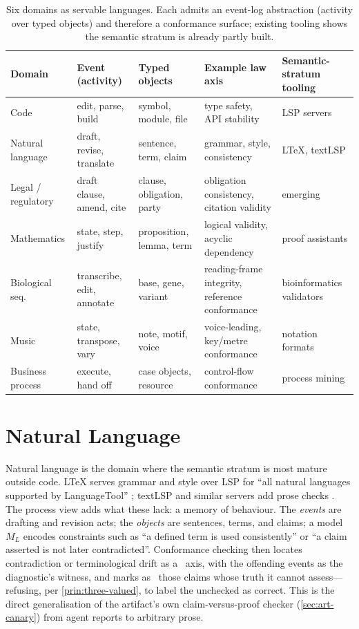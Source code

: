 \begin{table}[t]
\centering
\caption[Six languages under one conformance surface]{Six domains as servable
languages. Each admits an event-log abstraction (activity over typed objects) and
therefore a conformance surface; existing tooling shows the semantic stratum is
already partly built.}
\label{tab:domains}
\scriptsize
\begin{tabularx}{\textwidth}{@{}l Y Y Y l@{}}
\toprule
\textbf{Domain} & \textbf{Event (activity)} & \textbf{Typed objects} & \textbf{Example law axis} & \textbf{Semantic-stratum tooling} \\
\midrule
Code & edit, parse, build & symbol, module, file & type safety, API stability & LSP servers \citep{lsp-official} \\
Natural language & draft, revise, translate & sentence, term, claim & grammar, style, consistency & LTeX, textLSP \citep{ltex,textlsp} \\
Legal / regulatory & draft clause, amend, cite & clause, obligation, party & obligation consistency, citation validity & emerging \\
Mathematics & state, step, justify & proposition, lemma, term & logical validity, acyclic dependency & proof assistants \\
Biological seq. & transcribe, edit, annotate & base, gene, variant & reading-frame integrity, reference conformance & bioinformatics validators \\
Music & state, transpose, vary & note, motif, voice & voice-leading, key/metre conformance & notation formats \\
Business process & execute, hand off & case objects, resource & control-flow conformance & process mining \citep{vdaalst-book-2016} \\
\bottomrule
\end{tabularx}
\end{table}

\section{Natural Language}
\label{sec:al-nl}

Natural language is the domain where the semantic stratum is most mature outside
code. LTeX serves grammar and style over LSP for ``all natural languages
supported by LanguageTool'' \citep{ltex}; textLSP and similar servers add prose
checks \citep{textlsp}. The process view adds what these lack: a memory of
behaviour. The \emph{events} are drafting and revision acts; the \emph{objects}
are sentences, terms, and claims; a model $M_L$ encodes constraints such as
``a defined term is used consistently'' or ``a claim asserted is not later
contradicted''. Conformance checking then locates contradiction or terminological
drift as a \ axis, with the offending events as the diagnostic's witness,
and marks as \unknownstat\ those claims whose truth it cannot assess---refusing,
per \cref{prin:three-valued}, to label the unchecked as correct. This is the
direct generalisation of the artifact's own claim-versus-proof checker
(\cref{sec:art-canary}) from agent reports to arbitrary prose.

